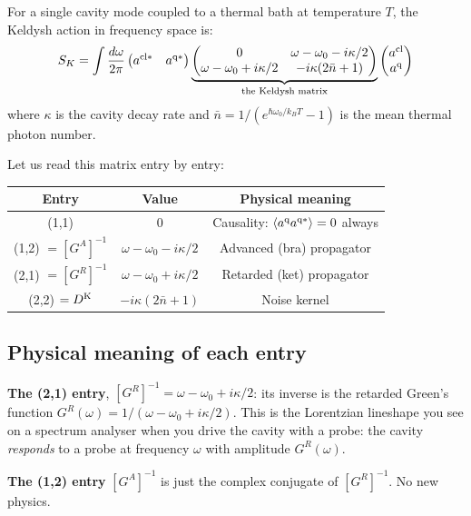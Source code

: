 \documentclass[12pt]{article}
\newcommand{\cl}{{\rm cl}}
\newcommand{\q}{{\rm q}}
\newcommand{\Keldysh}{{\rm K}}
\newcommand{\av}[1]{\langle #1 \rangle}
\providecommand{\cl}{{\rm cl}}
\providecommand{\q}{{\rm q}}
\providecommand{\Keldysh}{{\rm K}}
\begin{document}
For a single cavity mode coupled to a thermal bath at temperature $T$,
the Keldysh action in frequency space is:
\begin{equation}
  S_K = \int\frac{d\omega}{2\pi}
  \begin{pmatrix}a^{\cl*} & a^{\q*}\end{pmatrix}
  \underbrace{
  \begin{pmatrix}
    0 & \omega - \omega_0 - i\kappa/2\\
    \omega - \omega_0 + i\kappa/2 & -i\kappa(2\bar{n}+1)
  \end{pmatrix}
  }_{\text{the Keldysh matrix}}
  \begin{pmatrix}a^\cl\\a^\q\end{pmatrix}
  \label{eq:SK}
\end{equation}
where $\kappa$ is the cavity decay rate and $\bar{n} = 1/(e^{\hbar\omega_0/k_BT}-1)$
is the mean thermal photon number.

Let us read this matrix entry by entry:

\begin{center}
\begin{tabular}{ccc}
\toprule
Entry & Value & Physical meaning \\
\midrule
(1,1) & $0$ & Causality: $\av{a^\q a^{\q*}} = 0$ always \\
(1,2) $= [G^A]^{-1}$ & $\omega - \omega_0 - i\kappa/2$ & Advanced (bra) propagator \\
(2,1) $= [G^R]^{-1}$ & $\omega - \omega_0 + i\kappa/2$ & Retarded (ket) propagator \\
(2,2) $= D^\Keldysh$ & $-i\kappa(2\bar{n}+1)$ & Noise kernel \\
\bottomrule
\end{tabular}
\end{center}

\subsection{Physical meaning of each entry}

\textbf{The (2,1) entry}, $[G^R]^{-1} = \omega - \omega_0 + i\kappa/2$:
its inverse is the retarded Green's function
$G^R(\omega) = 1/(\omega - \omega_0 + i\kappa/2)$.
This is the Lorentzian lineshape you see on a spectrum analyser when
you drive the cavity with a probe: the cavity \emph{responds} to a
probe at frequency $\omega$ with amplitude $G^R(\omega)$.

\textbf{The (1,2) entry} $[G^A]^{-1}$ is just the complex conjugate of
$[G^R]^{-1}$. No new physics.
\end{document}
